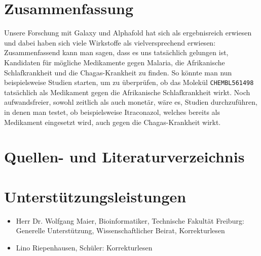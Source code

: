 \documentclass[10pt]{article}
\begin{document}
    \section{Zusammenfassung}\label{sec:zusammenfassung}
    Unsere Forschung mit Galaxy und Alphafold hat sich als ergebnisreich erwiesen und dabei haben sich viele
    Wirkstoffe als vielversprechend erwiesen: Zusammenfassend kann man sagen, dass es uns tatsächlich gelungen ist,
    Kandidaten für mögliche Medikamente gegen Malaria, die Afrikanische Schlafkrankheit und die Chagas-Krankheit zu
    finden.
    So könnte man nun beispielsweise Studien starten, um zu überprüfen, ob das Molekül \texttt{CHEMBL561498}
    tatsächlich als Medikament gegen die Afrikanische Schlafkrankheit wirkt.
    Noch aufwandsfreier, sowohl zeitlich als
    auch monetär, wäre es, Studien durchzuführen, in denen man testet, ob beispielsweise Itraconazol, welches bereits
    als Medikament eingesetzt wird, auch gegen die Chagas-Krankheit wirkt.

    \section{Quellen- und Literaturverzeichnis}\label{sec:quellen--und-literaturverzeichnis}

    

    \section{Unterstützungsleistungen}\label{sec:unterstuetzungsleistungen}

    \begin{itemize}
        \item Herr Dr. Wolfgang Maier, Bioinformatiker, Technische Fakultät Freiburg: Generelle Unterstützung,
        Wissenschaftlicher Beirat, Korrekturlesen

        \item Lino Riepenhausen, Schüler: Korrekturlesen
    \end{itemize}
\end{document}
